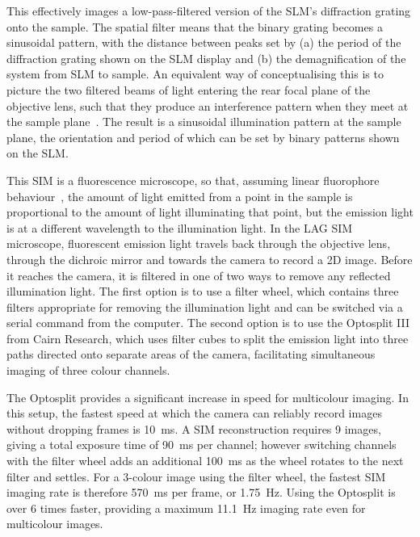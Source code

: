 This effectively images a low-pass-filtered version of the SLM's diffraction grating onto the sample. 
The spatial filter means that the binary grating becomes a sinusoidal pattern, with the distance between peaks set by (a) the period of the diffraction grating shown on the SLM display and (b) the demagnification of the system from SLM to sample. 
An equivalent way of conceptualising this is to picture the two filtered beams of light entering the rear focal plane of the objective lens, such that they produce an interference pattern when they meet at the sample plane~\cite[\textit{ch. 9}]{hecht2017optics}. 
The result is a sinusoidal illumination pattern at the sample plane, the orientation and period of which can be set by binary patterns shown on the SLM. 

This SIM is a fluorescence microscope, so that, assuming linear fluorophore behaviour~\cite{gustafsson2005nonlinear, shen1984principles}, the amount of light emitted from a point in the sample is proportional to the amount of light illuminating that point, but the emission light is at a different wavelength to the illumination light. 
In the LAG SIM microscope, fluorescent emission light travels back through the objective lens, through the dichroic mirror and towards the camera to record a 2D image. 
Before it reaches the camera, it is filtered in one of two ways to remove any reflected illumination light.
The first option is to use a filter wheel, which contains three filters appropriate for removing the illumination light and can be switched via a serial command from the computer. 
The second option is to use the Optosplit III from Cairn Research, which uses filter cubes to split the emission light into three paths directed onto separate areas of the camera, facilitating simultaneous imaging of three colour channels.

The Optosplit provides a significant increase in speed for multicolour imaging. 
In this setup, the fastest speed at which the camera can reliably record images without dropping frames is \SI{10}{\milli\second}. 
A SIM reconstruction requires 9 images, giving a total exposure time of \SI{90}{\milli\second} per channel; however switching channels with the filter wheel adds an additional \SI{100}{\milli\second} as the wheel rotates to the next filter and settles. 
For a 3-colour image using the filter wheel, the fastest SIM imaging rate is therefore \SI{570}{\milli\second} per frame, or \SI{1.75}{\hertz}. 
Using the Optosplit is over 6 times faster, providing a maximum \SI{11.1}{\hertz} imaging rate even for multicolour images.

